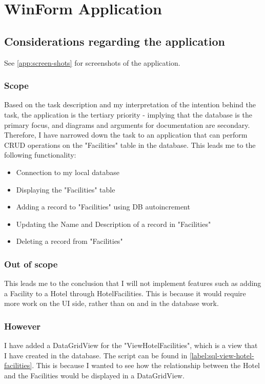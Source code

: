 \chapter{WinForm Application}
\label{chapter:winform-application}

\section{Considerations regarding the application}
See \ref*{app:screen-shots} for screenshots of the application.

\subsection{Scope}
Based on the task description and my interpretation of the intention behind the task, the application is the tertiary priority - implying that the database is the primary focus, and diagrams and arguments for documentation are secondary.
Therefore, I have narrowed down the task to an application that can perform CRUD operations on the "Facilities" table in the database. This leads me to the following functionality:

\begin{itemize}
    \item Connection to my local database
    \item Displaying the "Facilities" table
    \item Adding a record to "Facilities" using DB autoincrement
    \item Updating the Name and Description of a record in "Facilities"
    \item Deleting a record from "Facilities"
\end{itemize}

\subsection{Out of scope}
This leads me to the conclusion that I will not implement features such as adding a Facility to a Hotel through HotelFacilities. 
This is because it would require more work on the UI side, rather than on and in the database work.

\subsection{However}
I have added a DataGridView for the "ViewHotelFacilities", which is a view that I have created in the database.
The script can be found in \ref*{label:sql-view-hotel-facilities}. 
This is because I wanted to see how the relationship between the Hotel and the Facilities would be displayed in a DataGridView.

